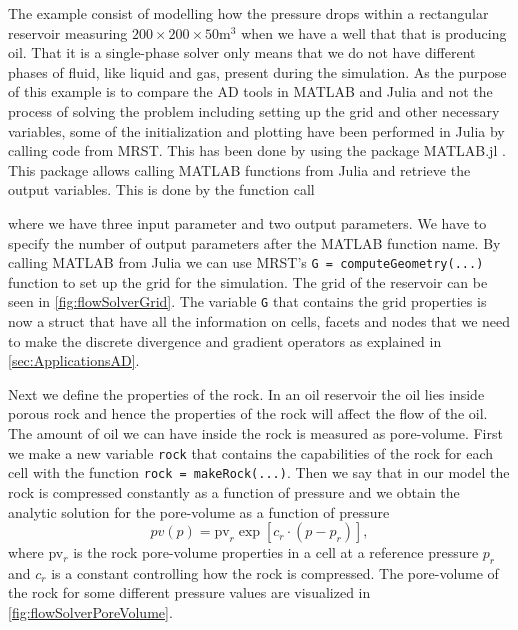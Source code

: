 The example consist of modelling how the pressure drops within a rectangular reservoir measuring $200\times 200 \times 50 \text{m}^3$ when we have a well that that is producing oil. That it is a single-phase solver only means that we do not have different phases of fluid, like liquid and gas, present during the simulation. As the purpose of this example is to compare the AD tools in MATLAB and Julia and not the process of solving the problem including setting up the grid and other necessary variables, some of the initialization and plotting have been performed in Julia by calling code from MRST. This has been done by using the package MATLAB.jl \emph{\citep{MATLAB.jl}}. This package allows calling MATLAB functions from Julia and retrieve the output variables. This is done by the function call

where we have three input parameter and two output parameters. We have to specify the number of output parameters after the MATLAB function name.  By calling MATLAB from Julia we can use MRST's \texttt{G = computeGeometry(...)} function to set up the grid for the simulation. The grid of the reservoir can be seen in \autoref{fig:flowSolverGrid}. The variable \texttt{G} that contains the grid properties is now a struct that have all the information on cells, facets and nodes that we need to make the discrete divergence and gradient operators as explained in \autoref{sec:ApplicationsAD}. 

Next we define the properties of the rock. In an oil reservoir the oil lies inside porous rock and hence the properties of the rock will affect the flow of the oil. The amount of oil we can have inside the rock is measured as pore-volume. First we make a new variable \texttt{rock} that contains the capabilities of the rock for each cell with the function  \texttt{rock = makeRock(...)}. Then we say that in our model the rock is compressed constantly as a function of pressure and we obtain the analytic solution for the pore-volume as a function of pressure
\begin{equation*}
    pv(p) = \text{pv}_r \exp[c_r\cdot(p-p_r)],
\end{equation*}
where pv$_r$ is the rock pore-volume properties in a cell at a reference pressure $p_r$ and $c_r$ is a constant controlling how the rock is compressed. The pore-volume of the rock for some different pressure values are visualized in \autoref{fig:flowSolverPoreVolume}. 


